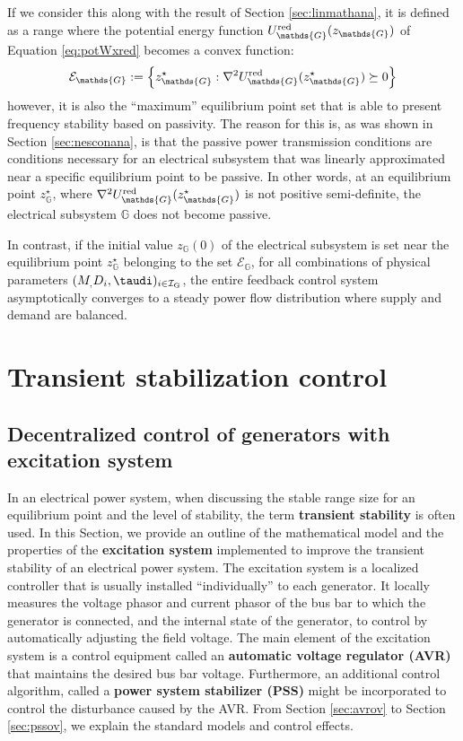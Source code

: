 \documentclass[tombow,dvipdfmx]{corona-a5-1.1}
\begin{document}
If we consider this along with the result of Section \ref{sec:linmathana}, it is defined as a range where the potential energy function $U_{\mathds{G}}^{\rm red} (z_{\mathds{G}})$ of Equation \ref{eq:potWxred} becomes a convex function:
\[
\mathcal{E}_{\mathds{G}}:=
\left\{
z_{\mathds{G}}^{\star} : \nabla^2 U_{\mathds{G}}^{\rm red} (z_{\mathds{G}}^{\star}) 
\succeq 0
\right\}
\]
however, it is also the “maximum” equilibrium point set that is able to present frequency stability based on passivity.
The reason for this is, as was shown in Section \ref{sec:nesconana}, is that the passive power transmission conditions are conditions necessary for an electrical subsystem that was linearly approximated near a specific equilibrium point to be passive.
In other words, at an equilibrium point $z_{\mathds{G}}^{\star}$, where $\nabla^2 U_{\mathds{G}}^{\rm red} (z_{\mathds{G}}^{\star}) $ is not positive semi-definite, the electrical subsystem $\mathds{G}$ does not become passive.

In contrast, if the initial value $z_{\mathds{G}}(0)$ of the electrical subsystem is set near the equilibrium point $z_{\mathds{G}}^{\star}$ belonging to the set $\mathcal{E}_{\mathds{G}}$,
for all combinations of physical parameters $(M_,D_i,\taudi)_{i \in \mathcal{I}_{\rm G}}$,
the entire feedback control system asymptotically converges to a steady power flow distribution where supply and demand are balanced.

\section{Transient stabilization control}\label{sec:transcont}

\subsection{Decentralized control of generators with excitation system}

In an electrical power system, when discussing the stable range size for an equilibrium point and the level of stability, the term \textbf{transient stability} is often used.
In this Section, we provide an outline of the mathematical model and the properties of the \textbf{excitation system} implemented to improve the transient stability of an electrical power system.
The excitation system is a localized controller that is usually installed “individually” to each generator.
It locally measures the voltage phasor and current phasor of the bus bar to which the generator is connected, and the internal state of the generator, to control by automatically adjusting the field voltage. The main element of the excitation system is a control equipment called an \textbf{automatic voltage regulator (AVR)} that maintains the desired bus bar voltage. Furthermore, an additional control algorithm, called a \textbf{power system stabilizer (PSS)} might be incorporated to control the disturbance caused by the AVR.
From Section \ref{sec:avrov} to Section \ref{sec:pssov}, we explain the standard models and control effects.
\end{document}
